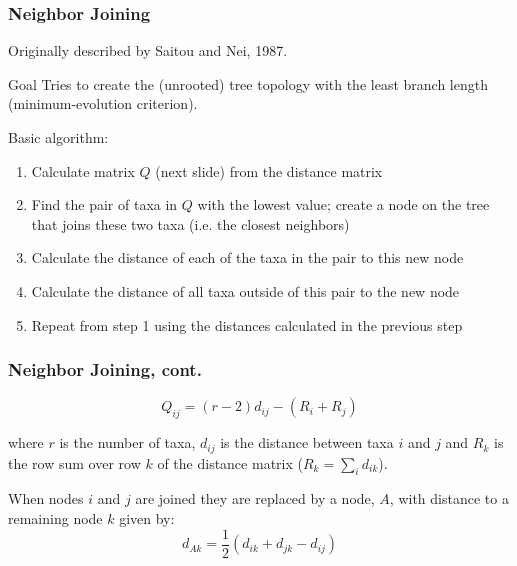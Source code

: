 \documentclass{beamer}
\begin{document}
\begin{frame}[shrink=5]
\frametitle{Neighbor Joining}

Originally described by Saitou and Nei, 1987.

\begin{block}{Goal}
Tries to create the (unrooted) tree topology with the least branch length
(minimum-evolution criterion).
\end{block}

Basic algorithm:
\begin{enumerate}
\item Calculate matrix $Q$ (next slide) from the distance matrix
\item Find the pair of taxa in $Q$ with the lowest value; create a node on the tree that joins these two taxa (i.e. the closest neighbors)
\item Calculate the distance of each of the taxa in the pair to this new node
\item Calculate the distance of all taxa outside of this pair to the new node
\item Repeat from step 1 using the distances calculated in the previous step
\end{enumerate}

\end{frame}

\begin{frame}
\frametitle{Neighbor Joining, cont.}

\[
Q_{ij} = (r - 2) d_{ij} - (R_i + R_j)
\]

where $r$ is the number of taxa, $d_{ij}$ is the distance between taxa $i$ and $j$ and $R_k$ is the row sum over row $k$ of the distance matrix ($R_k=\sum_i d_{ik}$).

\medskip

When nodes $i$ and $j$ are joined they are replaced by a node, $A$, with distance to a remaining node $k$ given by:
\[
d_{Ak} = \frac{1}{2} (d_{ik} + d_{jk} - d_{ij})
\]
    
\end{frame}
\end{document}
